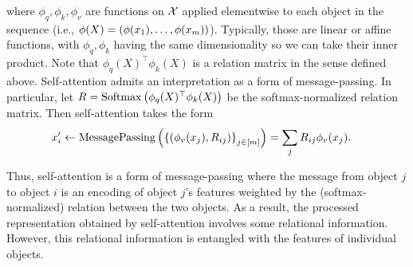 \noindent where $\phi_q, \phi_k, \phi_v$ are functions on ${\mathcal{X}}$ applied elementwise to each object in the sequence (i.e., $\phi(X) = \left(\phi(x_1), \ldots, \phi(x_m)\right)$). Typically, those are linear or affine functions, with $\phi_q, \phi_k$ having the same dimensionality so we can take their inner product. Note that $\phi_q(X)^\top \phi_k(X)$ is a relation matrix in the sense defined above. Self-attention admits an interpretation as a form of message-passing. In particular, let $R = \mathrm{Softmax}\left(\phi_q(X)^\top \phi_k(X)\right)$ be the softmax-normalized relation matrix. Then self-attention takes the form
\begin{equation}\label{eq:self_attn_message_passing}
    \begin{split}
        x_i' &\gets \mathrm{MessagePassing}\paren{\set{(\phi_v(x_j), R_{ij})}_{j \in [\m]}}%
        = \sum_{j} R_{ij} \phi_v(x_j).
    \end{split}
\end{equation}

Thus, self-attention is a form of message-passing where the message from object $j$ to object $i$ is an encoding of object $j$'s features weighted by the (softmax-normalized) relation between the two objects. As a result, the processed representation obtained by self-attention involves some relational information. However, this relational information is entangled with the features of individual objects.

